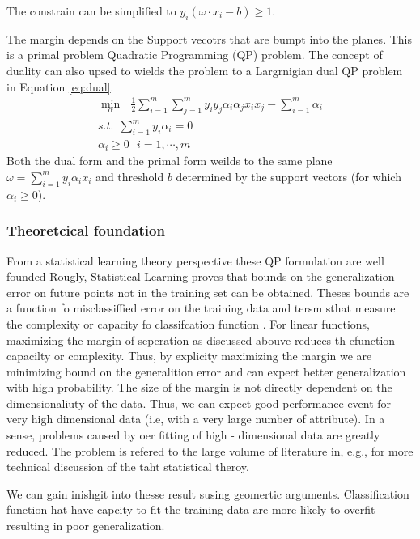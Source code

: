 The constrain can be simplified to $y_i(\omega \cdot x_i-b)\geq 1$. 


The margin depends on the Support vecotrs that are bumpt into the planes.  This is a primal problem Quadratic Programming (QP) problem. The concept of duality can also upsed to wields the problem to a  Largrnigian dual QP problem in Equation \ref{eq:dual}. 
\begin{equation}
\begin{array}{c}
\min_{\alpha} \ \ \   \frac{1}{2} \sum_{i=1}^{m}{\sum_{j=1}^{m}{y_iy_j\alpha_i\alpha_jx_ix_j}} - \sum_{i=1}^{m}{\alpha_i} \\
s.t. \ \ \sum_{i=1}^{m}{y_i\alpha_i}=0   \\
  \alpha_i \geq 0  \ \ \ i=1,\cdots , m 
  \end{array} 
\label{eq:dual}
\end{equation}
Both the dual form and the primal form weilds to the same plane $\omega=\sum_{i=1}^{m}y_i\alpha_i x_i$ and threshold $b$ determined by the support vectors (for which $\alpha_i\geq 0$). 

\subsubsection{Theoretcical foundation}
From a statistical learning theory perspective these QP formulation are well founded Rougly, Statistical Learning proves that bounds on the generalization error on future points not in the training set can be obtained. Theses bounds are a function fo misclassiffied error on the training data and tersm sthat measure the complexity or capacity fo classifcation function . For linear functions, maximizing the margin of seperation as discussed abouve reduces th efunction capacilty or complexity. Thus, by explicity maximizing the margin we are minimizing bound on the generalition error and can expect better generalization with high probability. The size of the margin is not directly dependent on the dimensionaliuty of the data. Thus, we can expect good performance event for very high dimensional data (i.e, with a very large number of attribute). In a sense, problems caused by oer fitting of high - dimensional data are greatly reduced. The problem is refered to the large volume of literature in, e.g., \cite{bookSVMoverfit11,statisticalSVM1} for more technical discussion of the taht statistical theroy. 

We can gain inishgit into thesse result susing geomertic arguments. Classification function hat have capcity to fit the training data are more likely to overfit  resulting in poor generalization.  

